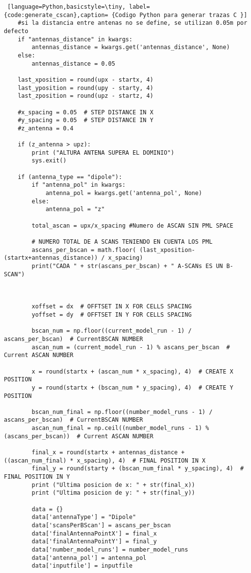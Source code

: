\begin{lstlisting} [language=Python,basicstyle=\tiny, label={code:generate_cscan},caption= {Codigo Python para generar trazas C }]
    #si la distancia entre antenas no se define, se utilizan 0.05m por defecto
    if "antennas_distance" in kwargs:
        antennas_distance = kwargs.get('antennas_distance', None)
    else:
        antennas_distance = 0.05

    last_xposition = round(upx - startx, 4)
    last_yposition = round(upy - starty, 4)
    last_zposition = round(upz - startz, 4)

    #x_spacing = 0.05  # STEP DISTANCE IN X
    #y_spacing = 0.05  # STEP DISTANCE IN Y
    #z_antenna = 0.4

    if (z_antenna > upz):
        print ("ALTURA ANTENA SUPERA EL DOMINIO")
        sys.exit()

    if (antenna_type == "dipole"):
        if "antenna_pol" in kwargs:
            antenna_pol = kwargs.get('antenna_pol', None)
        else:
            antenna_pol = "z"

        total_ascan = upx/x_spacing #Numero de ASCAN SIN PML SPACE

        # NUMERO TOTAL DE A SCANS TENIENDO EN CUENTA LOS PML
        ascans_per_bscan = math.floor( (last_xposition-(startx+antennas_distance)) / x_spacing)
        print("CADA " + str(ascans_per_bscan) + " A-SCANs ES UN B-SCAN")



        xoffset = dx  # OFFTSET IN X FOR CELLS SPACING
        yoffset = dy  # OFFTSET IN Y FOR CELLS SPACING

        bscan_num = np.floor((current_model_run - 1) / ascans_per_bscan)  # CurrentBSCAN NUMBER
        ascan_num = (current_model_run - 1) % ascans_per_bscan  # Current ASCAN NUMBER

        x = round(startx + (ascan_num * x_spacing), 4)  # CREATE X POSITION
        y = round(startx + (bscan_num * y_spacing), 4)  # CREATE Y POSITION

        bscan_num_final = np.floor((number_model_runs - 1) / ascans_per_bscan)  # CurrentBSCAN NUMBER
        ascan_num_final = np.ceil((number_model_runs - 1) % (ascans_per_bscan))  # Current ASCAN NUMBER

        final_x = round(startx + antennas_distance + ((ascan_num_final) * x_spacing), 4)  # FINAL POSITION IN X
        final_y = round(starty + (bscan_num_final * y_spacing), 4)  # FINAL POSITION IN Y
        print ("Ultima posicion de x: " + str(final_x))
        print ("Ultima posicion de y: " + str(final_y))

        data = {}
        data['antennaType'] = "Dipole"
        data['scansPerBScan'] = ascans_per_bscan
        data['finalAntennaPointX'] = final_x
        data['finalAntennaPointY'] = final_y
        data['number_model_runs'] = number_model_runs
        data['antenna_pol'] = antenna_pol
        data['inputfile'] = inputfile


\end{lstlisting}

